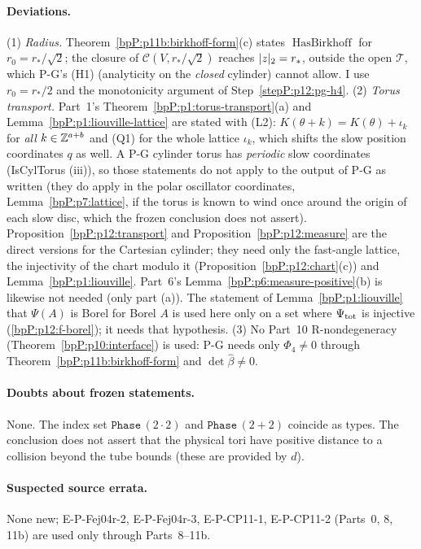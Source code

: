 \paragraph{Deviations.} (1) \emph{Radius.} Theorem~\ref{bpP:p11b:birkhoff-form}(c) states $\operatorname{HasBirkhoff}$ for $r_0=r_*/\sqrt2$; the closure of $\mathcal C(V,r_*/\sqrt2)$ reaches $\lvert z\rvert_2=r_*$, outside the open $\mathcal T$, which P-G's (H1) (analyticity on the \emph{closed} cylinder) cannot allow. I use $r_0=r_*/2$ and the monotonicity argument of Step~\ref{stepP:p12:pg-h4}. (2) \emph{Torus transport.} Part~1's Theorem~\ref{bpP:p1:torus-transport}(a) and Lemma~\ref{bpP:p1:liouville-lattice} are stated with (L2): $K(\theta+k)=K(\theta)+\iota_k$ for \emph{all} $k\in\mathbb{Z}^{a+b}$ and (Q1) for the whole lattice $\iota_k$, which shifts the slow position coordinates $q$ as well. A P-G cylinder torus has \emph{periodic} slow coordinates (IsCylTorus (iii)), so those statements do not apply to the output of P-G as written (they do apply in the polar oscillator coordinates, Lemma~\ref{bpP:p7:lattice}, if the torus is known to wind once around the origin of each slow disc, which the frozen conclusion does not assert). Proposition~\ref{bpP:p12:transport} and Proposition~\ref{bpP:p12:measure} are the direct versions for the Cartesian cylinder; they need only the fast-angle lattice, the injectivity of the chart modulo it (Proposition~\ref{bpP:p12:chart}(c)) and Lemma~\ref{bpP:p1:liouville}. Part~6's Lemma~\ref{bpP:p6:measure-positive}(b) is likewise not needed (only part (a)). The statement of Lemma~\ref{bpP:p1:liouville} that $\Psi(A)$ is Borel for Borel $A$ is used here only on a set where $\Psi_{\rm tot}$ is injective (\ref{bpP:p12:f-borel}); it needs that hypothesis. (3) No Part~10 R-nondegeneracy (Theorem~\ref{bpP:p10:interface}) is used: P-G needs only $\Phi_4\ne0$ through Theorem~\ref{bpP:p11b:birkhoff-form} and $\det\hat\beta\ne0$.

\paragraph{Doubts about frozen statements.} None. The index set $\texttt{Phase}\,(2\cdot2)$ and $\texttt{Phase}\,(2+2)$ coincide as types. The conclusion does not assert that the physical tori have positive distance to a collision beyond the tube bounds (these are provided by $d$).

\paragraph{Suspected source errata.} None new; E-P-Fej04r-2, E-P-Fej04r-3, E-P-CP11-1, E-P-CP11-2 (Parts~0, 8, 11b) are used only through Parts~8--11b.

